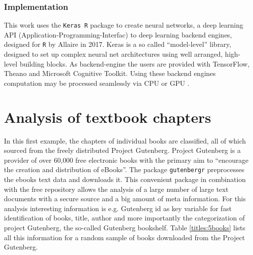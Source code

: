 \documentclass[11pt,a4paper]{article}
\begin{document}
\subsubsection{Implementation}
This work uses the \texttt{Keras R} package to create neural networks, a deep learning API (Application-Programming-Interfac) to deep learning backend engines, designed for \texttt{R} by Allaire in 2017. Keras is a so called “model-level” library, designed to set up complex neural net architectures using well arranged, high-level building blocks. As backend-engine the users are provided with TensorFlow, Theano and Microsoft Cognitive Toolkit. Using these backend engines computation may be processed seamlessly via CPU or GPU \cite{Chollet2018}.

\section{Analysis of textbook chapters}

In this first example, the chapters of individual books are classified, all of which sourced from the freely distributed Project Gutenberg. Project Gutenberg is a provider of over 60,000 free electronic books with the primary aim to “encourage the creation and distribution of eBooks”\cite{ProjectGutenberg}. The package \texttt{gutenbergr} \cite{gutenbergr} preprocesses the ebooks text data and downloads it. This convenient package in combination with the free repository allows the analysis of a large number of large text documents with a secure source and a big amount of meta information. For this analysis interesting information is e.g. Gutenberg id as key variable for fast identification of books, title, author and more importantly the categorization of project Gutenberg, the so-called Gutenberg bookshelf. Table \ref{titles:5books} lists all this information for a random sample of books downloaded from the Project Gutenberg.
\end{document}
